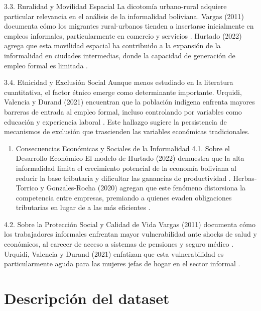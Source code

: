 \documentclass[Royal,times,sageh]{sagej}
\providecommand{\tightlist}{%
  \setlength{\itemsep}{0pt}\setlength{\parskip}{0pt}}
\begin{document}
3.3. Ruralidad y Movilidad Espacial La dicotomía urbano-rural adquiere
particular relevancia en el análisis de la informalidad boliviana.
Vargas (2011) documenta cómo los migrantes rural-urbanos tienden a
insertarse inicialmente en empleos informales, particularmente en
comercio y servicios \citep{vargas2011ser}. Hurtado (2022) agrega que
esta movilidad espacial ha contribuido a la expansión de la informalidad
en ciudades intermedias, donde la capacidad de generación de empleo
formal es limitada \citep{hurtado2022rol}.

3.4. Etnicidad y Exclusión Social Aunque menos estudiado en la
literatura cuantitativa, el factor étnico emerge como determinante
importante. Urquidi, Valencia y Durand (2021) encuentran que la
población indígena enfrenta mayores barreras de entrada al empleo
formal, incluso controlando por variables como educación y experiencia
laboral \citep{urquidi2021brecha}. Este hallazgo sugiere la persistencia
de mecanismos de exclusión que trascienden las variables económicas
tradicionales.

\begin{enumerate}
\def\labelenumi{\arabic{enumi}.}
\setcounter{enumi}{3}
\tightlist
\item
  Consecuencias Económicas y Sociales de la Informalidad 4.1. Sobre el
  Desarrollo Económico El modelo de Hurtado (2022) demuestra que la alta
  informalidad limita el crecimiento potencial de la economía boliviana
  al reducir la base tributaria y dificultar las ganancias de
  productividad \citep{hurtado2022rol}. Herbas-Torrico y Gonzales-Rocha
  (2020) agregan que este fenómeno distorsiona la competencia entre
  empresas, premiando a quienes evaden obligaciones tributarias en lugar
  de a las más eficientes \citep{herbas2020analisis}.
\end{enumerate}

4.2. Sobre la Protección Social y Calidad de Vida Vargas (2011)
documenta cómo los trabajadores informales enfrentan mayor
vulnerabilidad ante shocks de salud y económicos, al carecer de acceso a
sistemas de pensiones y seguro médico \citep{vargas2011ser}. Urquidi,
Valencia y Durand (2021) enfatizan que esta vulnerabilidad es
particularmente aguda para las mujeres jefas de hogar en el sector
informal \citep{urquidi2021brecha}.

\section{Descripción del dataset}\label{descripciuxf3n-del-dataset}
\end{document}
